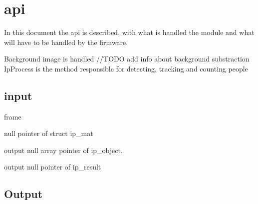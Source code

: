 \section*{api}

In this document the api is described, with what is handled the module and what will have to be handled by the firmware.

Background image is handled //\+T\+O\+DO add info about background substraction Ip\+Process is the method responsible for detecting, tracking and counting people

\subsection*{input}


\begin{DoxyItemize}
\item frame
\begin{DoxyItemize}
\item null pointer of struct ip\+\_\+mat 
\begin{DoxyCode}{0}
\DoxyCodeLine{  \{}
\end{DoxyCode}

\end{DoxyItemize}
\item output null array pointer of ip\+\_\+object.
\item output null pointer of ip\+\_\+result
\end{DoxyItemize}

\subsection*{Output}